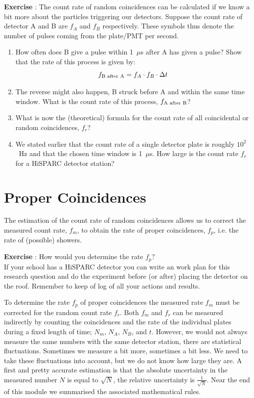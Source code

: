 \documentclass[12pt,a4paper]{article}
\numberwithin{equation}{section}
\numberwithin{figure}{section}
\newcounter{Exercise}
\numberwithin{table}{section}
\begin{document}
\begin{shaded}
\textbf{Exercise \theExercise {}} : The count rate of random coincidences can be calculated if we know a bit more about the particles triggering our detectors. Suppose the count rate of detector A and B are $f_A$ and $f_B$ respectively. These symbols thus denote the number of pulses coming from the plate/PMT per second.
\begin{enumerate}[-]
\item How often does B give a pulse within 1~$\mu$s after A has given a pulse? Show that the rate of this process is given by:
\begin{equation}
f_{\mbox{\scriptsize{B after A}}} = f_A \cdot f_B \cdot \Delta t
\end{equation}
\item The reverse might also happen, B struck before A and within the same time window. What is the count rate of this process, $f_{\mbox{\scriptsize{A after B}}}$?
\item What is now the (theoretical) formula for the count rate of all coincidental or random coincidences, $f_r$?
\item We stated earlier that the count rate of a single detector plate is roughly $10^2$~Hz and that the chosen time window is 1~$\mu$s. How large is the count rate $f_r$ for a HiSPARC detector station?
\end{enumerate}\end{shaded}

\section{Proper Coincidences}
The estimation of the count rate of random coincidences allows us to correct the measured count rate, $f_m$, to obtain the rate of proper coincidences, $f_p$, i.e. the rate of (possible) showers.

\begin{shaded}
\textbf{Exercise \theExercise {}} : How would you determine the rate $f_p$? \\
If your school has a HiSPARC detector you can write an work plan for this research question and do the experiment before (or after) placing the detector on the roof. Remember to keep of log of all your actions and results.\end{shaded}

To determine the rate $f_p$ of proper coincidences the measured rate $f_m$ must be corrected for the random count rate $f_r$. Both $f_m$ and $f_r$ can be measured indirectly by counting the coincidences and the rate of the individual plates during a fixed length of time; $N_m$, $N_A$, $N_B$, and $t$. However, we would not always measure the same numbers with the same detector station, there are statistical fluctuations. Sometimes we measure a bit more, sometimes a bit less. We need to take these fluctuations into account, but we do not know how large they are. A first and pretty accurate estimation is that the absolute uncertainty in the measured number $N$ is equal to $\sqrt{N}$, the relative uncertainty is $\frac{1}{\sqrt{N}}$. Near the end of this module we summarised the associated mathematical rules. 
\end{document}
